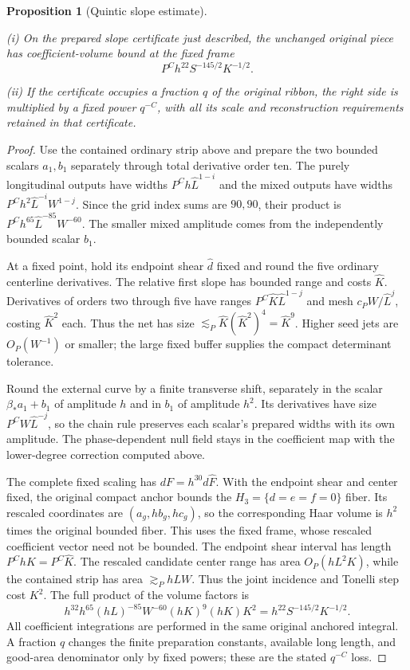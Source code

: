 \documentclass[11pt]{amsart}
\newtheorem{proposition}[theorem]{Proposition}
\theoremstyle{definition}
\theoremstyle{remark}
\numberwithin{equation}{section}
\begin{document}
\begin{proposition}[Quintic slope estimate]\label{low:5:qsc:slope}

\noindent\textup{(i)} On the prepared slope certificate just described, the unchanged original piece has coefficient-volume bound at the fixed frame
\[
 \boxed{\qquad P^C h^{22}S^{-145/2}K^{-1/2}.\qquad}
\]

\noindent\textup{(ii)} If the certificate occupies a fraction $q$ of the original ribbon, the right side is multiplied by a fixed power $q^{-C}$, with all its scale and reconstruction requirements retained in that certificate.
\end{proposition}
\begin{proof}
Use the contained ordinary strip above and prepare the two bounded scalars $a_1,b_1$ separately through total derivative order ten. The purely longitudinal outputs have widths $P^Ch\widehat L^{1-i}$ and the mixed outputs have widths $P^Ch^2\widehat L^{-i}W^{1-j}$. Since the grid index sums are $90,90$, their product is $P^Ch^{65}\widehat L^{-85}W^{-60}$. The smaller mixed amplitude comes from the independently bounded scalar $b_1$. 

At a fixed point, hold its endpoint shear $\widehat d$ fixed and round the five ordinary centerline derivatives. The relative first slope has bounded range and costs $\widehat K$. Derivatives of orders two through five have ranges $P^C\widehat K\widehat L^{1-j}$ and mesh $c_PW/\widehat L^j$, costing $\widehat K^2$ each. Thus the net has size $\lesssim_P\widehat K(\widehat K^2)^4=\widehat K^9$. Higher seed jets are $O_P(W^{-1})$ or smaller; the large fixed buffer supplies the compact determinant tolerance.

Round the external curve by a finite transverse shift, separately in the scalar $\beta_*a_1+b_1$ of amplitude $h$ and in $b_1$ of amplitude $h^2$. Its derivatives have size $P^CW\widehat L^{-j}$, so the chain rule preserves each scalar's prepared widths with its own amplitude. The phase-dependent null field stays in the coefficient map with the lower-degree correction computed above.

The complete fixed scaling has $dF=h^{30}d\widehat F$. With the endpoint shear and center fixed, the original compact anchor bounds the $H_3=\{d=e=f=0\}$ fiber. Its rescaled coordinates are $(a_g,hb_g,hc_g)$, so the corresponding Haar volume is $h^2$ times the original bounded fiber. This uses the fixed frame, whose rescaled coefficient vector need not be bounded. The endpoint shear interval has length $P^ChK=P^C\widehat K$. The rescaled candidate center range has area $O_P(hL^2K)$, while the contained strip has area $\gtrsim_PhLW$. Thus the joint incidence and Tonelli step cost $K^2$. The full product of the volume factors is
\[
h^{32}h^{65}(hL)^{-85}W^{-60}(hK)^9(hK)K^2
 =h^{22}S^{-145/2}K^{-1/2}.
\]
All coefficient integrations are performed in the same original anchored integral. A fraction $q$ changes the finite preparation constants, available long length, and good-area denominator only by fixed powers; these are the stated $q^{-C}$ loss.
\end{proof}
\end{document}
